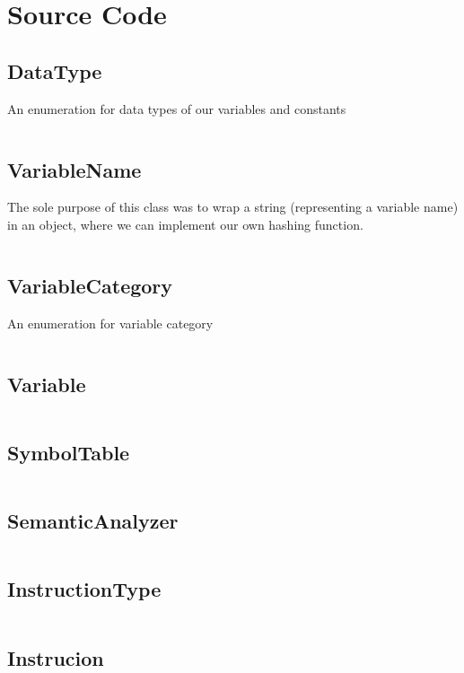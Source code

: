 \documentclass[12pt]{article}
\begin{document}
\section{Source Code}
\subsection{DataType}
An enumeration for data types of our variables and constants
\inputminted[xleftmargin = -40pt, xrightmargin = -40pt, frame = single, linenos]{java}{src/DataType.java}
\subsection{VariableName}
\label{variable_name_label}
The sole purpose of this class was to wrap a string (representing a variable name) in an object, where we can implement our own hashing function.
\inputminted[xleftmargin = -40pt, xrightmargin = -40pt, frame = single, linenos]{java}{src/VariableName.java}
\subsection{VariableCategory}
An enumeration for variable category
\inputminted[xleftmargin = -40pt, xrightmargin = -40pt, frame = single, linenos]{java}{src/VariableCategory.java}
\subsection{Variable}
\inputminted[xleftmargin = -40pt, xrightmargin = -40pt, frame = single, linenos]{java}{src/Variable.java}
\subsection{SymbolTable}
\label{symbol_table_label}
\inputminted[xleftmargin = -40pt, xrightmargin = -40pt, frame = single, linenos]{java}{src/SymbolTable.java}
\subsection{SemanticAnalyzer}
\inputminted[xleftmargin = -40pt, xrightmargin = -40pt, frame = single, linenos]{java}{src/SemanticAnalyzer.java}
\subsection{InstructionType}
\inputminted[xleftmargin = -40pt, xrightmargin = -40pt, frame = single, linenos]{java}{src/InstructionType.java}
\subsection{Instrucion}
\inputminted[xleftmargin = -40pt, xrightmargin = -40pt, frame = single, linenos]{java}{src/Instruction.java}
\end{document}
